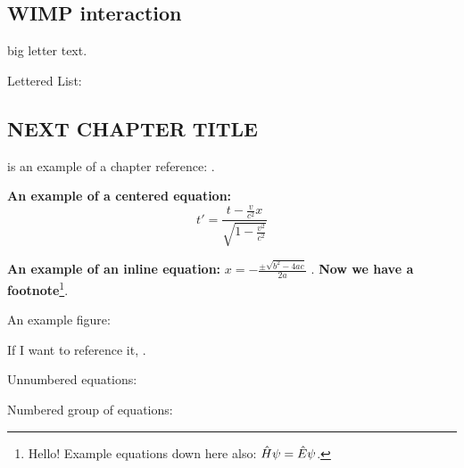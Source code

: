 \subsection{WIMP interaction} \label{sec:I}



 big letter text. \lipsum[5] 

Lettered List: 


\subsection{NEXT CHAPTER TITLE}

 is an example of a chapter reference: . \lipsum[1]

\lipsum[2-2] \textbf{An example of a centered equation:} \[
    t' = \frac{t - \frac{v}{c^2}x}{\sqrt{1 - \frac{v^2}{c^2}}}
\]

\lipsum[3-3] \textbf{An example of an inline equation:} $x = -\frac{\pm \sqrt{b^2 - 4ac}}{2a}$ \lipsum[4-4]. \textbf{Now we have a footnote}\footnote{Hello! Example equations down here also: $\hat{H} \psi = \hat{E}\psi$.}.

An example figure: 

If I want to reference it, .

Unnumbered equations:

Numbered group of equations:
